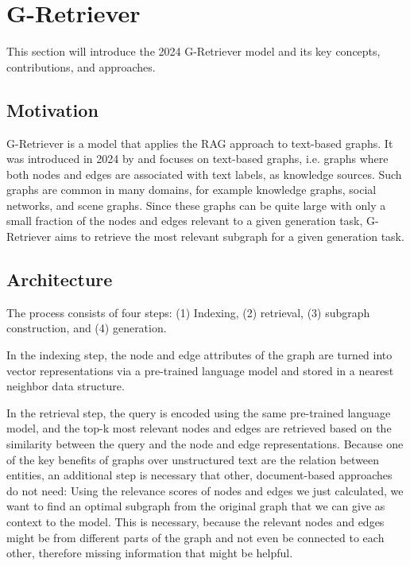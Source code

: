 \section{G-Retriever}

This section will introduce the 2024 G-Retriever model and its key concepts, contributions, and approaches.

\subsection{Motivation}
G-Retriever is a model that applies the RAG approach to text-based graphs.
It was introduced in 2024 by \cite{g-retriever} and focuses on text-based graphs, i.e. graphs where both nodes and edges are associated with text labels, as knowledge sources.
Such graphs are common in many domains, for example knowledge graphs, social networks, and scene graphs.
Since these graphs can be quite large with only a small fraction of the nodes and edges relevant to a given generation task, G-Retriever aims to retrieve the most relevant subgraph for a given generation task.

\subsection{Architecture}

The process consists of four steps: (1) Indexing, (2) retrieval, (3) subgraph construction, and (4) generation.

In the indexing step, the node and edge attributes of the graph are turned into vector representations via a pre-trained language model and stored in a nearest neighbor data structure.

In the retrieval step, the query is encoded using the same pre-trained language model, and the top-k most relevant nodes and edges are retrieved based on the similarity between the query and the node and edge representations.
Because one of the key benefits of graphs over unstructured text are the relation between entities, an additional step is necessary that other, document-based approaches do not need:
Using the relevance scores of nodes and edges we just calculated, we want to find an optimal subgraph from the original graph that we can give as context to the model.
This is necessary, because the relevant nodes and edges might be from different parts of the graph and not even be connected to each other, therefore missing information that might be helpful.

